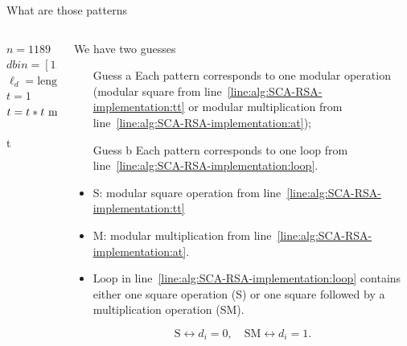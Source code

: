 \begin{frame}{What are those patterns}
\begin{columns}[T] %
\begin{column}{.48\textwidth}
{
\setlength{\interspacetitleruled}{0pt}%
\setlength{\algotitleheightrule}{0pt}%
\begin{algorithm}[H]
$n=1189$\\
$dbin=[1,1,0,1,0,1,1,1,0,1]$\\
$\ell_d=\text{length of }dbin$\\
$t = 1$\\
 	{
  	$t=t*t\textrm{~mod~} n$\label{line:alg:SCA-RSA-implementation:tt}\\
  	}
  	\Return t
\end{algorithm}
}
\end{column}%
\hfill%
\begin{column}{.57\textwidth}
We have two guesses
\begin{itemize}
    \item[Guess a] Each pattern corresponds to one modular operation (modular square from line~\ref{line:alg:SCA-RSA-implementation:tt} or modular multiplication from line~\ref{line:alg:SCA-RSA-implementation:at});
    \item[Guess b] Each pattern corresponds to one loop from line~\ref{line:alg:SCA-RSA-implementation:loop}.
\end{itemize}
\begin{itemize}
    \item S: modular square operation from line~\ref{line:alg:SCA-RSA-implementation:tt}
    \item M: modular multiplication from line~\ref{line:alg:SCA-RSA-implementation:at}.
    \item Loop in line~\ref{line:alg:SCA-RSA-implementation:loop} contains either one square operation (S) or one square followed by a multiplication operation (SM).
\end{itemize}
\[
\text{S} \longleftrightarrow d_i=0,\quad \text{SM} \longleftrightarrow d_i=1.
\]
\end{column}%
\end{columns}
\end{frame}

